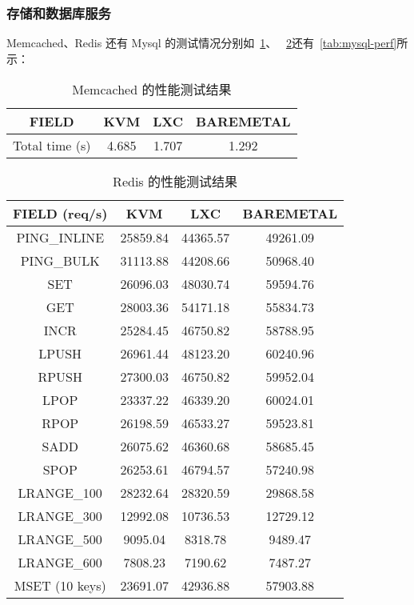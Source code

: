 \subsubsection{存储和数据库服务}

Memcached、Redis 还有 Mysql 的测试情况分别如~\ref{tab:memcached-perf}、
~\ref{tab:redis-perf}还有~\ref{tab:mysql-perf}所示：

\begin{table}[h]
    \centering
    \caption{Memcached 的性能测试结果}
    \begin{tabular}{||c c c c||}
        \hline
        FIELD & KVM & LXC & BAREMETAL \\
        \hline
        \hline
        Total time (s) & 4.685 & 1.707 & 1.292 \\
        \hline
    \end{tabular}
    \label{tab:memcached-perf}
\end{table}

\begin{table}[h]
    \centering
    \caption{Redis 的性能测试结果}
    \begin{tabular}{||c c c c||}
        \hline
        FIELD (req/s) & KVM & LXC & BAREMETAL \\
        \hline
        \hline
        PING_INLINE & 25859.84 & 44365.57 & 49261.09 \\
        \hline
        PING_BULK & 31113.88 & 44208.66 & 50968.40 \\
        \hline
        SET & 26096.03 & 48030.74 & 59594.76 \\
        \hline
        GET & 28003.36 & 54171.18 & 55834.73 \\
        \hline
        INCR & 25284.45 & 46750.82 & 58788.95 \\
        \hline
        LPUSH & 26961.44 & 48123.20 & 60240.96 \\
        \hline
        RPUSH & 27300.03 & 46750.82 & 59952.04 \\
        \hline
        LPOP & 23337.22 & 46339.20 & 60024.01 \\
        \hline
        RPOP & 26198.59 & 46533.27 & 59523.81 \\
        \hline
        SADD & 26075.62 & 46360.68 & 58685.45 \\
        \hline
        SPOP & 26253.61 & 46794.57 & 57240.98 \\
        \hline
        LRANGE_100 & 28232.64 & 28320.59 & 29868.58 \\
        \hline
        LRANGE_300 & 12992.08 & 10736.53 & 12729.12 \\
        \hline
        LRANGE_500 & 9095.04 & 8318.78 & 9489.47 \\
        \hline
        LRANGE_600 & 7808.23 & 7190.62 & 7487.27 \\
        \hline
        MSET (10 keys) & 23691.07 & 42936.88 & 57903.88 \\
        \hline
    \end{tabular}
    \label{tab:redis-perf}
\end{table}

